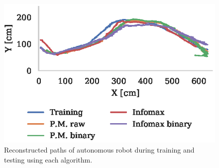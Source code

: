 \documentclass[letterpaper]{article}
\begin{document}
\begin{figure}[t]
    \centering
    \includegraphics{figures/robot_paths.eps}
    \caption{Reconstructed paths of autonomous robot during training and testing using each algorithm.}
    \label{fig:robot_paths}
\end{figure}
\end{document}
